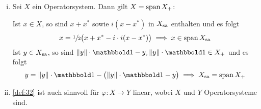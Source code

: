 \begin{bemerkung}[{name=[grundlegende Eigenschaften von Operatorsystemen]}]
	\leavevmode
	\begin{enumerate}[(i)]
		\item Sei $X$ ein Operatorsystem.
		Dann gilt $X = \Span X_+$:
		
		Ist $x \in X$, so sind $x+x^*$ sowie $ i(x-x^*)$ in $X_\sa$ enthalten und es folgt
		\[
			x = \sfrac{1}{2}\enbrace[\big]{x + x^* - i \cdot i (x-x^*)} \implies x \in \Span X_\sa
		\]
		Ist $y \in X_\sa$, so sind $\norm*{y} \cdot \ind -y, \norm*{y} \cdot \ind \in X_+$ und es folgt
		\[
			y = \norm*{y} \cdot \ind - \enbrace[\big]{\norm*{y} \cdot \ind -y} \implies X_\sa = \Span X_+
		\]
		\item \autoref{def:32} ist auch sinnvoll für $\varphi \colon X \to Y$ linear, wobei $X$ und $Y$ Operatorsysteme sind.
	\end{enumerate}
\end{bemerkung}


